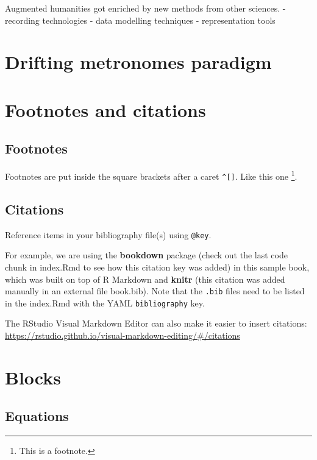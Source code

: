 \documentclass[
]{book}
\theoremstyle{definition}
\theoremstyle{definition}
\theoremstyle{definition}
\theoremstyle{definition}
\theoremstyle{remark}
\begin{document}
Augmented humanities got enriched by new methods from other sciences.
- recording technologies
- data modelling techniques
- representation tools

\hypertarget{chapDriftingMetronomes}{%
\chapter{Drifting metronomes paradigm}\label{chapDriftingMetronomes}}

\hypertarget{footnotes-and-citations}{%
\chapter{Footnotes and citations}\label{footnotes-and-citations}}

\hypertarget{footnotes}{%
\section{Footnotes}\label{footnotes}}

Footnotes are put inside the square brackets after a caret \texttt{\^{}{[}{]}}. Like this one \footnote{This is a footnote.}.

\hypertarget{citations}{%
\section{Citations}\label{citations}}

Reference items in your bibliography file(s) using \texttt{@key}.

For example, we are using the \textbf{bookdown} package \citep{R-bookdown} (check out the last code chunk in index.Rmd to see how this citation key was added) in this sample book, which was built on top of R Markdown and \textbf{knitr} \citep{xie2015} (this citation was added manually in an external file book.bib).
Note that the \texttt{.bib} files need to be listed in the index.Rmd with the YAML \texttt{bibliography} key.

The RStudio Visual Markdown Editor can also make it easier to insert citations: \url{https://rstudio.github.io/visual-markdown-editing/\#/citations}

\hypertarget{blocks}{%
\chapter{Blocks}\label{blocks}}

\hypertarget{equations}{%
\section{Equations}\label{equations}}
\end{document}
